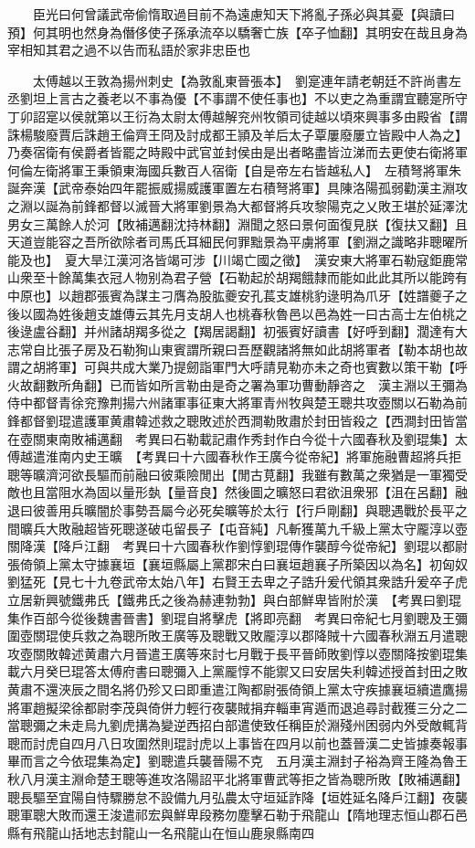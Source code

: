 　　臣光曰何曾議武帝偷惰取過目前不為遠慮知天下將亂子孫必與其憂【與讀曰預】何其明也然身為僭侈使子孫承流卒以驕奢亡族【卒子恤翻】其明安在哉且身為宰相知其君之過不以告而私語於家非忠臣也

　　太傅越以王敦為揚州刺史【為敦亂東晉張本】　劉寔連年請老朝廷不許尚書左丞劉坦上言古之養老以不事為優【不事謂不使任事也】不以吏之為重謂宜聽寔所守丁卯詔寔以侯就第以王衍為太尉太傅越解兖州牧領司徒越以頃來興事多由殿省【謂誅楊駿廢賈后誅趙王倫齊王冏及討成都王頴及羊后太子覃屢廢屢立皆殿中人為之】乃奏宿衛有侯爵者皆罷之時殿中武官並封侯由是出者略盡皆泣涕而去更使右衛將軍何倫左衛將軍王秉領東海國兵數百人宿衛【自是帝左右皆越私人】　左積弩將軍朱誕奔漢【武帝泰始四年罷振威揚威護軍置左右積弩將軍】具陳洛陽孤弱勸漢主淵攻之淵以誕為前鋒都督以滅晉大將軍劉景為大都督將兵攻黎陽克之乂敗王堪於延澤沈男女三萬餘人於河【敗補邁翻沈持林翻】淵聞之怒曰景何面復見朕【復扶又翻】且天道豈能容之吾所欲除者司馬氏耳細民何罪黜景為平虜將軍【劉淵之識略非聰曜所能及也】　夏大旱江漢河洛皆竭可涉【川竭亡國之徵】　漢安東大將軍石勒寇鉅鹿常山衆至十餘萬集衣冠人物别為君子營【石勒起於胡羯餓隸而能如此此其所以能跨有中原也】以趙郡張賓為謀主刁膺為股肱夔安孔萇支雄桃豹逯明為爪牙【姓譜夔子之後以國為姓後趙支雄傳云其先月支胡人也桃春秋魯邑以邑為姓一曰古高士左伯桃之後逯盧谷翻】并州諸胡羯多從之【羯居謁翻】初張賓好讀書【好呼到翻】濶達有大志常自比張子房及石勒狥山東賓謂所親曰吾歷觀諸將無如此胡將軍者【勒本胡也故謂之胡將軍】可與共成大業乃提劒詣軍門大呼請見勒亦未之奇也賓數以策干勒【呼火故翻數所角翻】已而皆如所言勒由是奇之署為軍功曹動靜咨之　漢主淵以王彌為侍中都督青徐兖豫荆揚六州諸軍事征東大將軍青州牧與楚王聰共攻壺關以石勒為前鋒都督劉琨遣護軍黄肅韓述救之聰敗述於西澗勒敗肅於封田皆殺之【西澗封田皆當在壺關東南敗補邁翻　考異曰石勒載記肅作秀封作白今從十六國春秋及劉琨集】太傅越遣淮南内史王曠　【考異曰十六國春秋作王廣今從帝紀】將軍施融曹超將兵拒聰等曠濟河欲長驅而前融曰彼乘險閒出【閒古莧翻】我雖有數萬之衆猶是一軍獨受敵也且當阻水為固以量形埶【量音良】然後圖之曠怒曰君欲沮衆邪【沮在呂翻】融退曰彼善用兵曠闇於事勢吾屬今必死矣曠等於太行【行戶剛翻】與聰遇戰於長平之間曠兵大敗融超皆死聰遂破屯留長子【屯音純】凡斬獲萬九千級上黨太守龎淳以壺關降漢【降戶江翻　考異曰十六國春秋作劉惇劉琨傳作襲醇今從帝紀】劉琨以都尉張倚領上黨太守據襄垣【襄垣縣屬上黨郡宋白曰襄垣趙襄子所築因以為名】初匈奴劉猛死【見七十九卷武帝太始八年】右賢王去卑之子誥升爰代領其衆誥升爰卒子虎立居新興號鐵弗氏【鐵弗氏之後為赫連勃勃】與白部鮮卑皆附於漢　【考異曰劉琨集作百部今從後魏書晉書】劉琨自將擊虎【將即亮翻　考異曰帝紀七月劉聰及王彌圍壺關琨使兵救之為聰所敗王廣等及聰戰又敗龎淳以郡降賊十六國春秋淵五月遣聰攻壺關敗韓述黄肅六月晉遣王廣等來討七月戰于長平晉師敗劉惇以壺關降按劉琨集載六月癸巳琨答太傅府書曰聰彌入上黨龎惇不能禦又曰安居失利韓述授首封田之敗黄肅不還浹辰之間名將仍殄又曰即重遣江陶都尉張倚領上黨太守疾據襄垣續遣鷹揚將軍趙擬梁徐都尉李茂與倚併力輕行夜襲賊捐弃輜車宵遁而退追尋討截獲三分之二當聰彌之未走烏九劉虎搆為變逆西招白部遣使致任稱臣於淵殘州困弱内外受敵輒背聰而討虎自四月八日攻圍然則琨討虎以上事皆在四月以前也蓋晉漢二史皆據奏報事畢而言之今依琨集為定】劉聰遣兵襲晉陽不克　五月漢主淵封子裕為齊王隆為魯王　秋八月漢主淵命楚王聰等進攻洛陽詔平北將軍曹武等拒之皆為聰所敗【敗補邁翻】聰長驅至宜陽自恃驟勝怠不設備九月弘農太守垣延詐降【垣姓延名降戶江翻】夜襲聰軍聰大敗而還王浚遣祁宏與鮮卑段務勿塵擊石勒于飛龍山【隋地理志恒山郡石邑縣有飛龍山括地志封龍山一名飛龍山在恒山鹿泉縣南四
